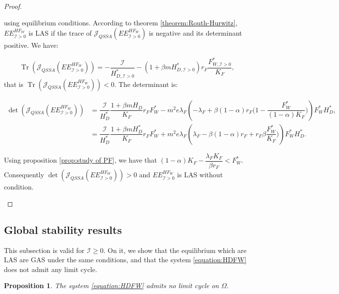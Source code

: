 \documentclass{article}
\newcommand{\lfw}{\lambda_{F}}
\newcommand{\lfw}{\lambda_{F}}
\newcommand{\cI}{\mathcal{I}}
\DeclareMathOperator{\Tr}{Tr}
\newtheorem{prop}{Proposition}
\begin{document}
\begin{proof}
\begin{itemize}
using equilibrium conditions.  According to theorem \ref{theorem:Routh-Hurwitz},  $EE^{HF_W}_{\cI > 0}$ is LAS if the trace of $\mathcal{J}_{QSSA}(EE^{HF_W}_{\cI > 0}) $ is negative and its determinant positive. We have:

\begin{equation*}
\Tr(\mathcal{J}_{QSSA}(EE^{HF_W}_{\cI > 0})) = -\dfrac{\cI}{H^*_{D, \cI > 0}} -(1+\beta m H^*_{D, \cI > 0}) r_F \dfrac{F^*_{W, \cI > 0}}{K_F}, 
\end{equation*}
that is $\Tr(\mathcal{J}_{QSSA}(EE^{HF_W}_{\cI > 0})) < 0$.
The determinant is:

\begin{align*}
\det(\mathcal{J}_{QSSA}(EE^{HF_W}_{\cI > 0})) &= \dfrac{\cI}{H_D^*} \dfrac{1 + \beta m H_D}{K_F} r_F F_W^* - m^2 e \lfw \left(-\lfw + \beta(1-\alpha)r_F \Big(1- \dfrac{F_W^*}{(1-\alpha) K_F} \Big) \right) F_W^* H_D^*, \\
&= \dfrac{\cI}{H_D^*} \dfrac{1 + \beta m H_D^*}{K_F} r_F F_W^* + m^2 e \lfw \left(\lfw - \beta(1-\alpha)r_F + r_F \beta\dfrac{F_W^*}{ K_F} \Big) \right) F_W^* H_D^*.
\end{align*}

Using proposition \ref{prop:study of PF}, we have that $(1-\alpha)K_F - \dfrac{\lfw K_F}{\beta r_F} < F_W^*$. Consequently $\det(\mathcal{J}_{QSSA}(EE^{HF_W}_{\cI > 0})) > 0$ and $EE^{HF_W}_{\cI > 0}$ is LAS without condition.
\end{itemize}
\end{proof}

\subsection{Global stability results}
This subsection is valid for $\cI \geq 0$. On it, we show that the equilibrium which are LAS are GAS under the same conditions, and that the system \eqref{equation:HDFW} does not admit any limit cycle. 

\begin{prop} \label{prop:no limit cycle, 2D}
The system \eqref{equation:HDFW} admits no limit cycle on $\Omega$.
\end{prop}
\end{document}
